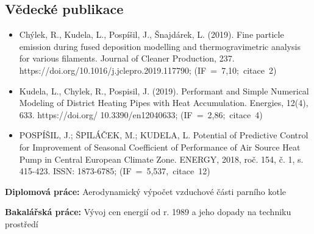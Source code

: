 \subsection*{Vědecké publikace}
\begin{itemize}[label={}, leftmargin=*]
  \item Chýlek, R., Kudela, L., Pospíšil, J., Šnajdárek, L. (2019). Fine
  particle emission during fused deposition modelling and thermogravimetric
  analysis for various filaments. Journal of Cleaner Production, 237.
  https://doi.org/10.1016/j.jclepro.2019.117790;
  \newline\mbox{(IF = 7,10; citace 2)}

  \item Kudela, L., Chylek, R., Pospisil, J. (2019). Performant and Simple
  Numerical Modeling of District Heating Pipes with Heat Accumulation. Energies,
  12(4), 633. https://doi.org/
  10.3390/en12040633; \mbox{(IF = 2,86; citace 4)}

  \item POSPÍŠIL, J.; ŠPILÁČEK, M.; KUDELA, L. Potential of Predictive
  Control for Improvement of Seasonal Coefficient of Performance of Air Source
  Heat Pump in Central European Climate Zone. ENERGY, 2018, roč. 154, č. 1, s. 
  415-423. ISSN: 1873-6785; \mbox{(IF = 5,537, citace 12)} 
\end{itemize}

\noindent \textbf{Diplomová práce:} Aerodynamický výpočet vzduchové části
parního kotle

\smallskip
\noindent \textbf{Bakalářská práce:} Vývoj cen energií od r. 1989 a jeho dopady
na techniku prostředí


